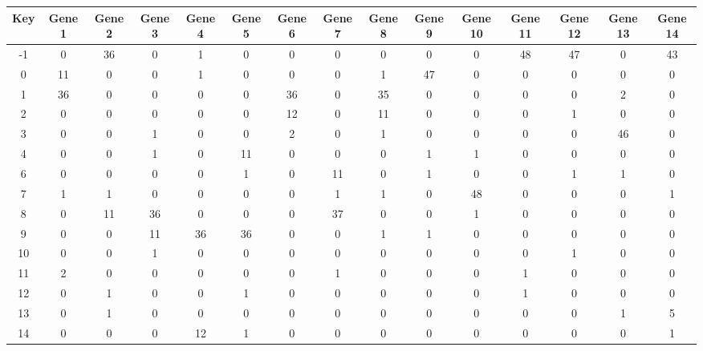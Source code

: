 \begin{tabular}{|c|c|c|c|c|c|c|c|c|c|c|c|c|c|c|}
\hline
Key & Gene 1 & Gene 2 & Gene 3 & Gene 4 & Gene 5 & Gene 6 & Gene 7 & Gene 8 & Gene 9 & Gene 10 & Gene 11 & Gene 12 & Gene 13 & Gene 14 \\
\hline
-1 & 0 & 36 & 0 & 1 & 0 & 0 & 0 & 0 & 0 & 0 & 48 & 47 & 0 & 43 \\
0 & 11 & 0 & 0 & 1 & 0 & 0 & 0 & 1 & 47 & 0 & 0 & 0 & 0 & 0 \\
1 & 36 & 0 & 0 & 0 & 0 & 36 & 0 & 35 & 0 & 0 & 0 & 0 & 2 & 0 \\
2 & 0 & 0 & 0 & 0 & 0 & 12 & 0 & 11 & 0 & 0 & 0 & 1 & 0 & 0 \\
3 & 0 & 0 & 1 & 0 & 0 & 2 & 0 & 1 & 0 & 0 & 0 & 0 & 46 & 0 \\
4 & 0 & 0 & 1 & 0 & 11 & 0 & 0 & 0 & 1 & 1 & 0 & 0 & 0 & 0 \\
6 & 0 & 0 & 0 & 0 & 1 & 0 & 11 & 0 & 1 & 0 & 0 & 1 & 1 & 0 \\
7 & 1 & 1 & 0 & 0 & 0 & 0 & 1 & 1 & 0 & 48 & 0 & 0 & 0 & 1 \\
8 & 0 & 11 & 36 & 0 & 0 & 0 & 37 & 0 & 0 & 1 & 0 & 0 & 0 & 0 \\
9 & 0 & 0 & 11 & 36 & 36 & 0 & 0 & 1 & 1 & 0 & 0 & 0 & 0 & 0 \\
10 & 0 & 0 & 1 & 0 & 0 & 0 & 0 & 0 & 0 & 0 & 0 & 1 & 0 & 0 \\
11 & 2 & 0 & 0 & 0 & 0 & 0 & 1 & 0 & 0 & 0 & 1 & 0 & 0 & 0 \\
12 & 0 & 1 & 0 & 0 & 1 & 0 & 0 & 0 & 0 & 0 & 1 & 0 & 0 & 0 \\
13 & 0 & 1 & 0 & 0 & 0 & 0 & 0 & 0 & 0 & 0 & 0 & 0 & 1 & 5 \\
14 & 0 & 0 & 0 & 12 & 1 & 0 & 0 & 0 & 0 & 0 & 0 & 0 & 0 & 1 \\
\hline
\end{tabular}